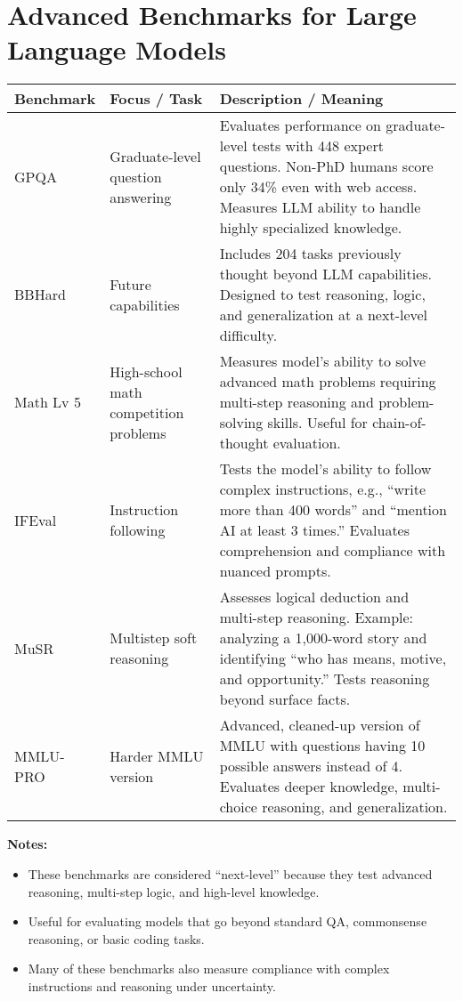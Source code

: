 \section{Advanced Benchmarks for Large Language Models}

\begin{tabularx}{\textwidth}{|>{\hsize=0.2\hsize}X|>{\hsize=0.3\hsize}X|>{\hsize=0.5\hsize}X|}
\hline
\textbf{Benchmark} & \textbf{Focus / Task} & \textbf{Description / Meaning} \\
\hline
GPQA & Graduate-level question answering & Evaluates performance on graduate-level tests with 448 expert questions. Non-PhD humans score only 34\% even with web access. Measures LLM ability to handle highly specialized knowledge. \\
\hline
BBHard & Future capabilities & Includes 204 tasks previously thought beyond LLM capabilities. Designed to test reasoning, logic, and generalization at a next-level difficulty. \\
\hline
Math Lv 5 & High-school math competition problems & Measures model’s ability to solve advanced math problems requiring multi-step reasoning and problem-solving skills. Useful for chain-of-thought evaluation. \\
\hline
IFEval & Instruction following & Tests the model’s ability to follow complex instructions, e.g., “write more than 400 words” and “mention AI at least 3 times.” Evaluates comprehension and compliance with nuanced prompts. \\
\hline
MuSR & Multistep soft reasoning & Assesses logical deduction and multi-step reasoning. Example: analyzing a 1,000-word story and identifying “who has means, motive, and opportunity.” Tests reasoning beyond surface facts. \\
\hline
MMLU-PRO & Harder MMLU version & Advanced, cleaned-up version of MMLU with questions having 10 possible answers instead of 4. Evaluates deeper knowledge, multi-choice reasoning, and generalization. \\
\hline
\end{tabularx}

\vspace{1em}
\textbf{Notes:}
\begin{itemize}
    \item These benchmarks are considered “next-level” because they test advanced reasoning, multi-step logic, and high-level knowledge.  
    \item Useful for evaluating models that go beyond standard QA, commonsense reasoning, or basic coding tasks.  
    \item Many of these benchmarks also measure compliance with complex instructions and reasoning under uncertainty. 
\end{itemize}


